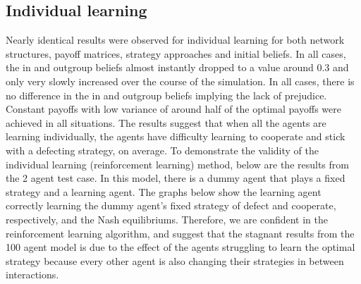\documentclass[]{llncs}
\begin{document}
\subsection{Individual learning}
Nearly identical results were observed for individual learning for both network structures, payoff matrices, strategy approaches and initial beliefs. In all cases, the in and outgroup beliefs almost instantly dropped to a value around 0.3 and only very slowly increased over the course of the simulation. In all cases, there is no difference in the in and outgroup beliefs implying the lack of prejudice. Constant payoffs with low variance of around half of the optimal payoffs were achieved in all situations. The results suggest that when all the agents are learning individually, the agents have difficulty learning to cooperate and stick with a defecting strategy, on average. 
To demonstrate the validity of the individual learning (reinforcement learning) method, below are the results from the 2 agent test case. In this model, there is a dummy agent that plays a fixed strategy and a learning agent. The graphs below show the learning agent correctly learning the dummy agent’s fixed strategy of defect and cooperate, respectively, and the Nash equilibriums. Therefore, we are confident in the reinforcement learning algorithm, and suggest that the stagnant results from the 100 agent model is due to the effect of the agents struggling to learn the optimal strategy because every other agent is also changing their strategies in between interactions. 
 
\end{document}
